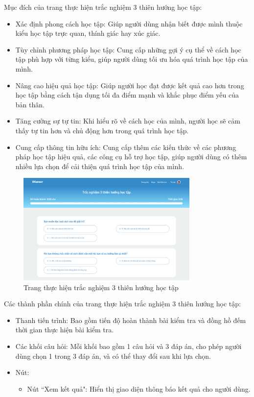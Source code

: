 Mục đích của trang thực hiện trắc nghiệm 3 thiên hướng học tập:
\begin{itemize}
    \item Xác định phong cách học tập: Giúp người dùng nhận biết được mình thuộc kiểu học tập trực quan, thính giác hay xúc giác.
    \item Tùy chỉnh phương pháp học tập: Cung cấp những gợi ý cụ thể về cách học tập phù hợp với từng kiểu, giúp người dùng tối ưu hóa quá trình học tập của mình.
    \item Nâng cao hiệu quả học tập: Giúp người học đạt được kết quả cao hơn trong học tập bằng cách tận dụng tối đa điểm mạnh và khắc phục điểm yếu của bản thân.
    \item Tăng cường sự tự tin: Khi hiểu rõ về cách học của mình, người học sẽ cảm thấy tự tin hơn và chủ động hơn trong quá trình học tập.
    \item Cung cấp thông tin hữu ích: Cung cấp thêm các kiến thức về các phương pháp học tập hiệu quả, các công cụ hỗ trợ học tập, giúp người dùng có thêm nhiều lựa chọn để cải thiện quá trình học tập của mình.
\end{itemize}

\begin{figure}[H]
    \centering
    \includegraphics[width=0.8\textwidth]
    {images/chap5/learningStyle.png}
    \vspace{0.5cm}
    \caption{Trang thực hiện trắc nghiệm 3 thiên hướng học tập}
\end{figure}

Các thành phần chính của trang thực hiện trắc nghiệm 3 thiên hướng học tập:
\begin{itemize}
    \item Thanh tiến trình: Bao gồm tiến độ hoàn thành bài kiểm tra và đồng hồ đếm thời gian thực hiện bài kiểm tra.
    \item Các khối câu hỏi: Mỗi khối bao gồm 1 câu hỏi và 3 đáp án, cho phép người dùng chọn 1 trong 3 đáp án, và có thể thay đổi sau khi lựa chọn.
    \item Nút:
        \begin{itemize}
            \item Nút ``Xem kết quả": Hiển thị giao diện thông báo kết quả cho người dùng.
        \end{itemize}
\end{itemize}

